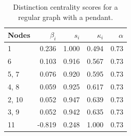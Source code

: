 \begin{table}
\centering
\caption{\label{tab:rege}Distinction centrality scores for a regular graph with a pendant.}
\centering
\begin{tabular}[t]{lrrrr}
\toprule
Nodes & $\beta_i$ & $s_i$ & $\kappa_i$ & $\alpha$\\
\midrule
1 & 0.236 & 1.000 & 0.494 & 0.73\\
6 & 0.103 & 0.916 & 0.567 & 0.73\\
5, 7 & 0.076 & 0.920 & 0.595 & 0.73\\
4, 8 & 0.059 & 0.925 & 0.617 & 0.73\\
2, 10 & 0.052 & 0.947 & 0.639 & 0.73\\
3, 9 & 0.052 & 0.942 & 0.635 & 0.73\\
11 & -0.819 & 0.248 & 1.000 & 0.73\\
\bottomrule
\end{tabular}
\end{table}
